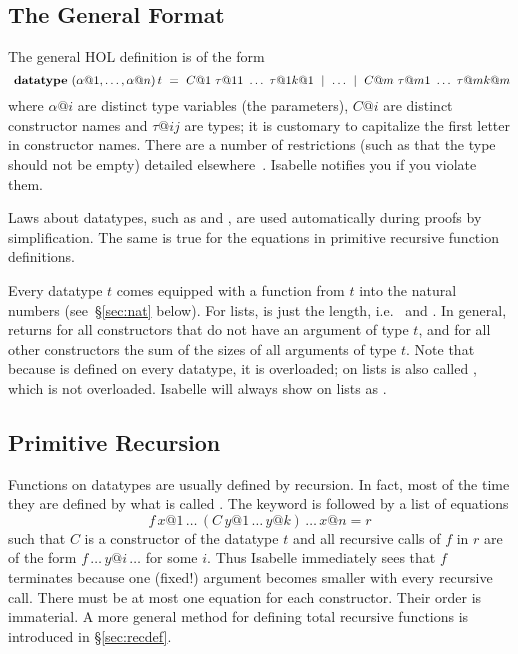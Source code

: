 \subsection{The General Format}
\label{sec:general-datatype}

The general HOL  definition is of the form
\[
\isacommand{datatype}~(\alpha@1, \dots, \alpha@n) \, t ~=~
C@1~\tau@{11}~\dots~\tau@{1k@1} ~\mid~ \dots ~\mid~
C@m~\tau@{m1}~\dots~\tau@{mk@m}
\]
where $\alpha@i$ are distinct type variables (the parameters), $C@i$ are distinct
constructor names and $\tau@{ij}$ are types; it is customary to capitalize
the first letter in constructor names. There are a number of
restrictions (such as that the type should not be empty) detailed
elsewhere~\cite{isabelle-HOL}. Isabelle notifies you if you violate them.

Laws about datatypes, such as  and
, are used automatically
during proofs by simplification.  The same is true for the equations in
primitive recursive function definitions.

Every datatype $t$ comes equipped with a  function from $t$ into
the natural numbers (see~{\S}\ref{sec:nat} below). For lists,  is
just the length, i.e.\  and .  In general,  returns  for all constructors
that do not have an argument of type $t$, and for all other constructors
 the sum of the sizes of all arguments of type $t$. Note that because
 is defined on every datatype, it is overloaded; on lists
 is also called , which is not overloaded.
Isabelle will always show  on lists as .


\subsection{Primitive Recursion}

Functions on datatypes are usually defined by recursion. In fact, most of the
time they are defined by what is called .
The keyword  is followed by a list of
equations
\[ f \, x@1 \, \dots \, (C \, y@1 \, \dots \, y@k)\, \dots \, x@n = r \]
such that $C$ is a constructor of the datatype $t$ and all recursive calls of
$f$ in $r$ are of the form $f \, \dots \, y@i \, \dots$ for some $i$. Thus
Isabelle immediately sees that $f$ terminates because one (fixed!) argument
becomes smaller with every recursive call. There must be at most one equation
for each constructor.  Their order is immaterial.
A more general method for defining total recursive functions is introduced in
{\S}\ref{sec:recdef}.


